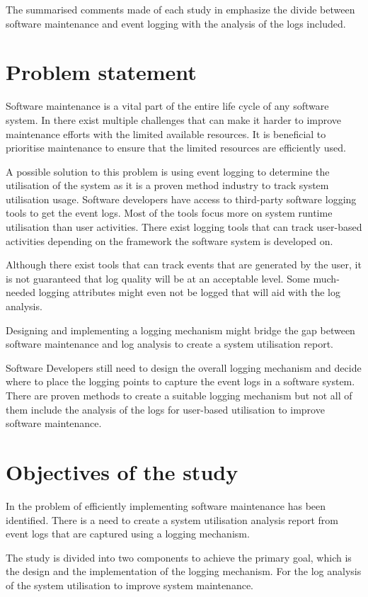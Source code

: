 The summarised comments made of each study in  emphasize the divide between software maintenance and event logging with the analysis of the logs included.

\section{Problem statement}\label{sec:ch1_problemStatement}
Software maintenance is a vital part of the entire life cycle of any software system. In  there exist multiple challenges that can make it harder to improve maintenance efforts with the limited available resources. It is beneficial to prioritise maintenance to ensure that the limited resources are efficiently used. \par A possible solution to this problem is using event logging to determine the utilisation of the system as it is a proven method industry to track system utilisation usage. Software developers have access to third-party software logging tools to get the event logs. Most of the tools focus more on system runtime utilisation than user activities. There exist logging tools that can track user-based activities depending on the framework the software system is developed on.\par Although there exist tools that can track events that are generated by the user, it is not guaranteed that log quality will be at an acceptable level. Some much-needed logging attributes might even not be logged that will aid with the log analysis.\par Designing and implementing a logging mechanism might bridge the gap between software maintenance and log analysis to create a system utilisation report.\par Software Developers still need to design the overall logging mechanism and decide where to place the logging points to capture the event logs in a software system. There are proven methods to create a suitable logging mechanism but not all of them include the analysis of the logs for user-based utilisation to improve software maintenance.

\section{Objectives of the study}\label{sec:ch1_objectives}
In  the problem of efficiently implementing software maintenance has been identified. There is a need to create a system utilisation analysis report from event logs that are captured using a logging mechanism. \par The study is divided into two components to achieve the primary goal, which is the design and the implementation of the logging mechanism. For the log analysis of the system utilisation to improve system maintenance.

